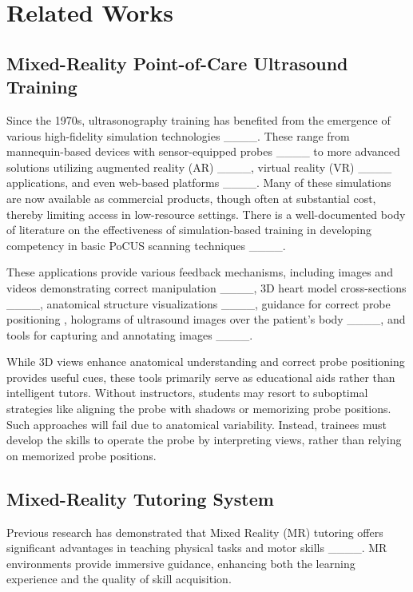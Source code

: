 \section{Related Works}
\subsection{Mixed-Reality Point-of-Care Ultrasound Training}
 Since the 1970s, ultrasonography training has benefited from the emergence of various high-fidelity simulation technologies ____. These range from mannequin-based devices with sensor-equipped probes ____ to more advanced solutions utilizing augmented reality (AR) ____, virtual reality (VR) ____ applications, and even web-based platforms ____. Many of these simulations are now available as commercial products, though often at substantial cost, thereby limiting access in low-resource settings. There is a well-documented body of literature on the effectiveness of simulation-based training in developing competency in basic PoCUS scanning techniques ____.

These applications provide various feedback mechanisms, including images and videos demonstrating correct manipulation ____, 3D heart model cross-sections ____, anatomical structure visualizations ____, guidance for correct probe positioning \cite {sim3,web4}, holograms of ultrasound images over the patient's body ____, and tools for capturing and annotating images ____.

While 3D views enhance anatomical understanding and correct probe positioning provides useful cues, these tools primarily serve as educational aids rather than intelligent tutors.  Without instructors, students may resort to suboptimal strategies like aligning the probe with shadows or memorizing probe positions. Such approaches will fail due to anatomical variability. Instead, trainees must develop the skills to operate the probe by interpreting views, rather than relying on memorized probe positions.

\subsection{Mixed-Reality Tutoring System}

Previous research has demonstrated that Mixed Reality (MR) tutoring offers significant advantages in teaching physical tasks and motor skills ____. MR environments provide immersive guidance, enhancing both the learning experience and the quality of skill acquisition.

